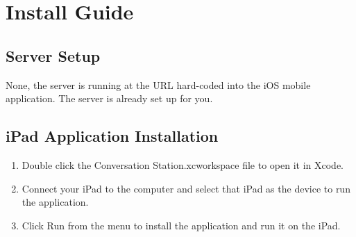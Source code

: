\chapter{Install Guide}

\section{Server Setup}

None, the server is running at the URL hard-coded into the iOS mobile application. The server is already set up for you.

\section{iPad Application Installation}

\begin{enumerate}
\item Double click the Conversation Station.xcworkspace file to open it in Xcode.
\item Connect your iPad to the computer and select that iPad as the device to run the application.
\item Click Run from the menu to install the application and run it on the iPad.
\end{enumerate}